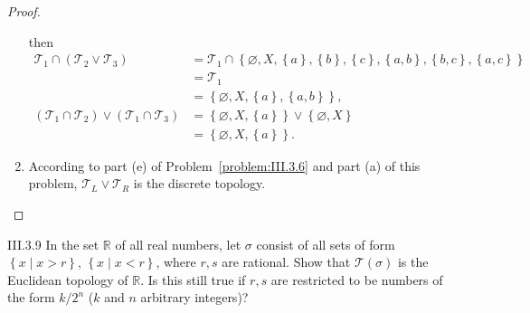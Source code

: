 \begin{proof}
\begin{enumerate}[label={(\alph*)}]
		      then
		      \begingroup
		      \allowdisplaybreaks%
		      \begin{align*}
			      \mathscr{T}_{1} \cap (\mathscr{T}_{2} \vee \mathscr{T}_{3})                        & = \mathscr{T}_{1} \cap \left\{ \varnothing, X, \left\{ a \right\}, \left\{ b \right\}, \left\{ c \right\}, \left\{ a, b \right\}, \left\{ b, c \right\}, \left\{ a, c \right\} \right\} \\
			                                                                                         & = \mathscr{T}_{1}                                                                                                                                                                       \\
			                                                                                         & = \left\{ \varnothing, X, \left\{ a \right\}, \left\{ a, b \right\} \right\},                                                                                                           \\
			      (\mathscr{T}_{1} \cap \mathscr{T}_{2}) \vee (\mathscr{T}_{1} \cap \mathscr{T}_{3}) & = \left\{ \varnothing, X, \left\{ a \right\} \right\} \vee \left\{ \varnothing, X \right\}                                                                                              \\
			                                                                                         & = \left\{ \varnothing, X, \left\{ a \right\} \right\}.
		      \end{align*}
		      \endgroup
		\item According to part (e) of Problem~\ref{problem:III.3.6} and part (a) of this problem, \( \mathscr{T}_{L} \vee \mathscr{T}_{R} \) is the discrete topology.
	\end{enumerate}
\end{proof}

\begin{problem}{III.3.9}
In the set \(\mathbb{R}\) of all real numbers, let \( \sigma \) consist of all sets of form \( \left\{ x \mid x > r \right\} \), \( \left\{ x \mid x < r \right\} \), where \( r, s \) are rational. Show that \( \mathscr{T}(\sigma) \) is the Euclidean topology of \( \mathbb{R} \). Is this still true if \( r, s \) are restricted to be numbers of the form \( k/2^{n} \) (\(k\) and \(n\) arbitrary {\color{red}integers})?
\end{problem}

